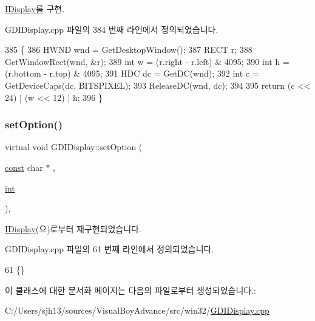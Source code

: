 \mbox{\hyperlink{class_i_display_a2f7a55f63c5e4b24245aa88228afab68}{I\+Display}}를 구현.



G\+D\+I\+Display.\+cpp 파일의 384 번째 라인에서 정의되었습니다.


\begin{DoxyCode}
385 \{
386   HWND wnd = GetDesktopWindow();
387   RECT r;
388   GetWindowRect(wnd, &r);
389   \textcolor{keywordtype}{int} w = (r.right - r.left) & 4095;
390   \textcolor{keywordtype}{int} h = (r.bottom - r.top) & 4095;
391   HDC dc = GetDC(wnd);
392   \textcolor{keywordtype}{int} c = GetDeviceCaps(dc, BITSPIXEL);
393   ReleaseDC(wnd, dc);
394 
395   \textcolor{keywordflow}{return} (c << 24) | (w << 12) | h;
396 \}
\end{DoxyCode}
\mbox{\label{class_g_d_i_display_a4e8f52858b49c9132c77c2f14b13bead}} 
\subsubsection{\texorpdfstring{set\+Option()}{setOption()}}
{\footnotesize\ttfamily virtual void G\+D\+I\+Display\+::set\+Option (\begin{DoxyParamCaption}\item[{\mbox{\hyperlink{getopt1_8c_a2c212835823e3c54a8ab6d95c652660e}{const}} char $\ast$}]{,  }\item[{\mbox{\hyperlink{_util_8cpp_a0ef32aa8672df19503a49fab2d0c8071}{int}}}]{ }\end{DoxyParamCaption})\hspace{0.3cm}{\ttfamily [inline]}, {\ttfamily [virtual]}}



\mbox{\hyperlink{class_i_display_a1766244708c252bb8781892c76c20ba9}{I\+Display}}(으)로부터 재구현되었습니다.



G\+D\+I\+Display.\+cpp 파일의 61 번째 라인에서 정의되었습니다.


\begin{DoxyCode}
61 \{\}
\end{DoxyCode}


이 클래스에 대한 문서화 페이지는 다음의 파일로부터 생성되었습니다.\+:\begin{DoxyCompactItemize}
\item 
C\+:/\+Users/sjh13/sources/\+Visual\+Boy\+Advance/src/win32/\mbox{\hyperlink{_g_d_i_display_8cpp}{G\+D\+I\+Display.\+cpp}}\end{DoxyCompactItemize}
